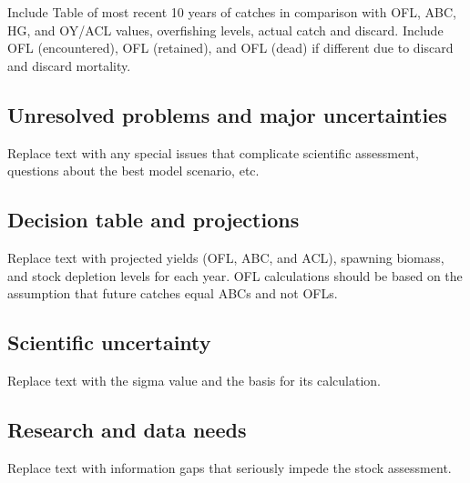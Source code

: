 \documentclass[11pt,
  english,
  letterpaper,
]{article}
\begin{document}
Include Table of most recent 10 years of catches in comparison with OFL, ABC, HG, and OY/ACL values, overfishing levels, actual catch and discard. Include OFL (encountered), OFL (retained), and OFL (dead) if different due to discard and discard mortality.

\hypertarget{unresolved-problems-and-major-uncertainties}{%
\subsection*{Unresolved problems and major uncertainties}\label{unresolved-problems-and-major-uncertainties}}

Replace text with any special issues that complicate scientific assessment, questions about the best model scenario, etc.

\hypertarget{decision-table-and-projections}{%
\subsection*{Decision table and projections}\label{decision-table-and-projections}}

Replace text with projected yields (OFL, ABC, and ACL), spawning biomass, and stock depletion levels for each year. OFL calculations should be based on the assumption that future catches equal ABCs and not OFLs.

\hypertarget{scientific-uncertainty}{%
\subsection*{Scientific uncertainty}\label{scientific-uncertainty}}

Replace text with the sigma value and the basis for its calculation.

\hypertarget{research-and-data-needs}{%
\subsection*{Research and data needs}\label{research-and-data-needs}}

Replace text with information gaps that seriously impede the stock assessment.

\pagebreak
\setlength{\parskip}{5mm plus1mm minus1mm}
\setcounter{page}{1}
\renewcommand{\thefigure}{\arabic{figure}}
\renewcommand{\thetable}{\arabic{table}}
\setcounter{table}{0}
\setcounter{figure}{0}
\end{document}

